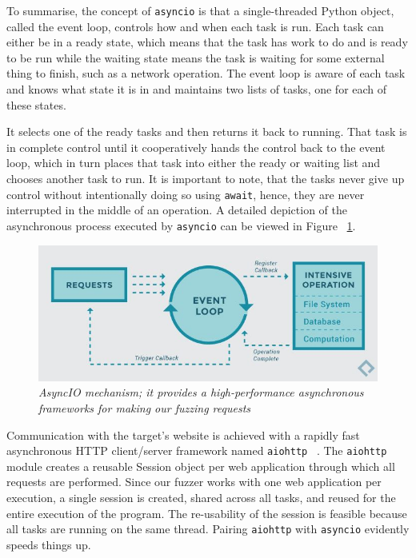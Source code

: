 To summarise, the concept of {\tt asyncio} is that a single-threaded Python object, called the event loop, controls how and when each task is run. Each task can either be in a ready state, which means that the task has work to do and is ready to be run while the waiting state means the task is waiting for some external thing to finish, such as a network operation. The event loop is aware of each task and knows what state it is in and maintains two lists of tasks, one for each of these states. 

It selects one of the ready tasks and then returns it back to running. That task is in complete control until it cooperatively hands the control back to the event loop, which in turn places that task into either the ready or waiting list and chooses another task to run. It is important to note, that the tasks never give up control without intentionally doing so using {\tt await}, hence, they are never interrupted in the middle of an operation. A detailed depiction of the asynchronous process executed by {\tt asyncio} can be viewed in Figure ~\ref{fig:asyncio_image_source}.

\begin{figure}[ht]
 \centering
 \captionsetup{justification=centering}
 \includegraphics[width=\linewidth]{figures/asyncio_process.jpg}
 \caption[AsyncIO mechanism]
 {\textit{AsyncIO mechanism; it provides a high-performance asynchronous frameworks for making our fuzzing requests} ~\cite{asyncio_image_source}}
 \label{fig:asyncio_image_source}
\end{figure}

Communication with the target's website is achieved with a rapidly fast asynchronous HTTP client/server framework named {\tt aiohttp} ~\cite{aiohttp}. The {\tt aiohttp} module creates a reusable Session object per web application through which all requests are performed. Since our fuzzer works with one web application per execution, a single session is created, shared across all tasks, and reused for the entire execution of the program. The re-usability of the session is feasible because all tasks are running on the same thread. Pairing {\tt aiohttp} with {\tt asyncio} evidently speeds things up.

